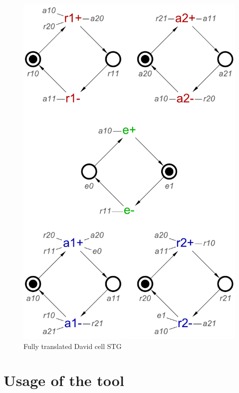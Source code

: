 \documentclass[british,conference,compsoc]{IEEEtran}
\begin{document}
\begin{figure}[h]
\vspace{-4mm}
\begin{centering}
\includegraphics[scale=0.3]{Images/dc-translated-stg}
\par\end{centering}
\protect\caption{\label{fig:dc-stg-translated} Fully translated David cell STG}
\vspace{-3mm}
\end{figure}

\vspace{-3mm}

\section{Usage of the tool\label{sec:tool-use}}
\end{document}
